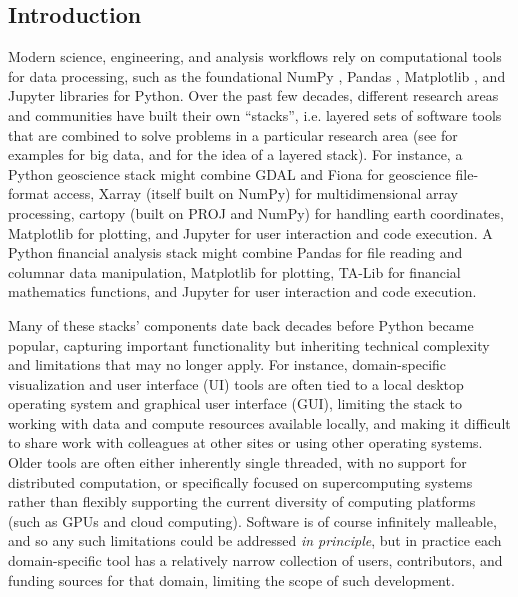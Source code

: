 \subsection{Introduction \label{introduction}}

Modern science, engineering, and analysis workflows rely on computational tools for data processing, such as the foundational NumPy \cite{harris:nature20}, Pandas \cite{mckinney:scipy10}, Matplotlib \cite{hunter:cse07}, and Jupyter \cite{kluyver:ppap16} libraries for Python. Over the past few decades, different research areas and communities have built their own ``stacks'', i.e. layered sets of software tools that are combined to solve problems in a particular research area (see \cite{stancin:mipro19} for examples for big data, and \cite{briscoe:pcna00} for the idea of a layered stack). For instance, a Python geoscience stack might combine GDAL and Fiona for geoscience file-format access, Xarray \cite{hoyer:jors17} (itself built on NumPy) for multidimensional array processing, cartopy (built on PROJ and NumPy) for handling earth coordinates, Matplotlib for plotting, and Jupyter for user interaction and code execution. A Python financial analysis stack might combine Pandas for file reading and columnar data manipulation, Matplotlib for plotting, TA-Lib for financial mathematics functions, and Jupyter for user interaction and code execution.

Many of these stacks' components date back decades before Python became popular, capturing important functionality but inheriting technical complexity and limitations that may no longer apply. For instance, domain-specific visualization and user interface (UI) tools are often tied to a local desktop operating system and graphical user interface (GUI), limiting the stack to working with data and compute resources available locally, and making it difficult to share work with colleagues at other sites or using other operating systems. Older tools are often either inherently single threaded, with no support for distributed computation, or specifically focused on supercomputing systems rather than flexibly supporting the current diversity of computing platforms (such as GPUs and cloud computing). Software is of course infinitely malleable, and so any such limitations could be addressed \emph{in principle}, but in practice each domain-specific tool has a relatively narrow collection of users, contributors, and funding sources for that domain, limiting the scope of such development.

